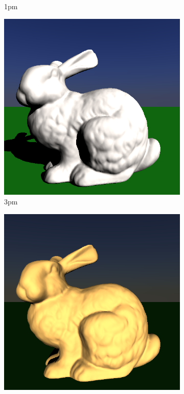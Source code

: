 \begin{figure}[h]
\begin{subfigure}[b]{0.3\textwidth}
		\caption{1pm}
		\label{fig:skylight13}
	\end{subfigure}
	\begin{subfigure}[b]{0.3\textwidth}
		\includegraphics[width=\textwidth]{week2/2/bunny_15.png}
		\caption{3pm}
		\label{fig:skylight15}
	\end{subfigure}
	\begin{subfigure}[b]{0.3\textwidth}
		\includegraphics[width=\textwidth]{week2/2/bunny_17.png}

\end{subfigure}
\end{figure}
